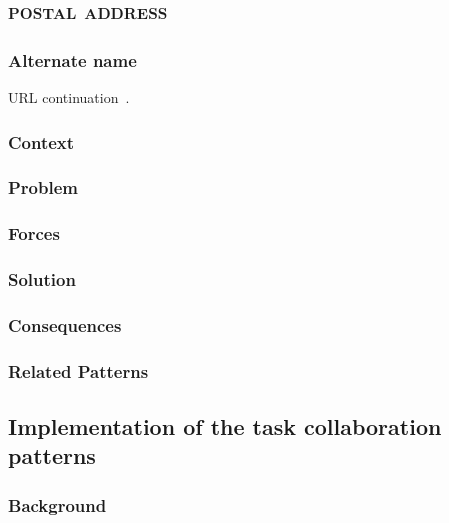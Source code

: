 \documentclass[prodmode]{style/acmlarge}
\begin{document}
\subsection{\textsc{\textbf{postal address}}}

\subsubsection*{Alternate name} URL continuation~\cite{url-continuation}.

\subsubsection*{Context}

\subsubsection*{Problem}

\subsubsection*{Forces}

\subsubsection*{Solution}

\subsubsection*{Consequences}

\subsubsection*{Related Patterns}



\subsection{Implementation of the task collaboration patterns}

\subsubsection*{Background}
\end{document}
